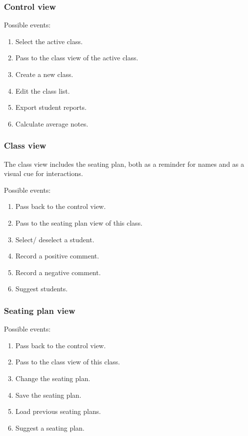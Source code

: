 \documentclass[10pt]{article}
\begin{document}
\subsubsection{Control view}

Possible events: 
\begin{enumerate}
\item Select the active class.
\item Pass to the class view of the active class.
\item Create a new class.
\item Edit the class list.
\item Export student reports.
\item Calculate average notes.
\end{enumerate}

\subsubsection{Class view}

The class view includes the seating plan, both as a reminder for names and as a visual cue for interactions.

Possible events: 
\begin{enumerate}
\item Pass back to the control view.
\item Pass to the seating plan view of this class.
\item Select/ deselect a student.
\item Record a positive comment.
\item Record a negative comment.
\item Suggest students.
\end{enumerate}

\subsubsection{Seating plan view}

Possible events: 
\begin{enumerate}
\item Pass back to the control view.
\item Pass to the class view of this class.
\item Change the seating plan.
\item Save the seating plan.
\item Load previous seating plans.
\item Suggest a seating plan.
\end{enumerate}
\end{document}
